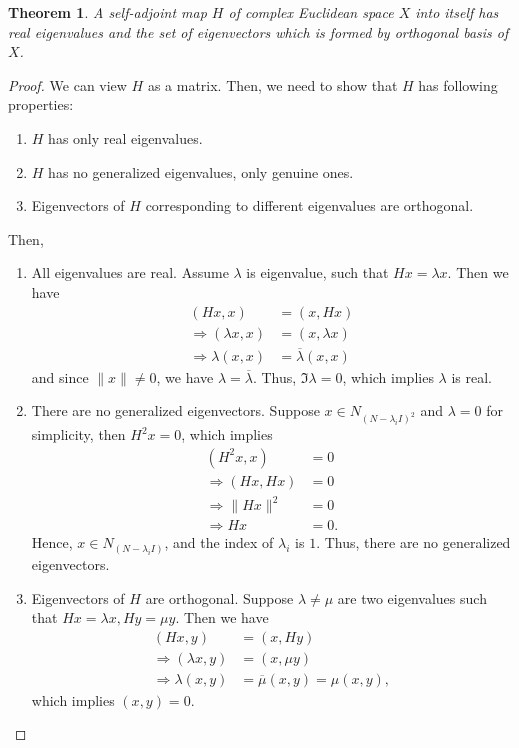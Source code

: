 \documentclass[11pt]{book}
\newtheorem{theorem}{Theorem}[section]
\theoremstyle{definition}
\numberwithin{equation}{chapter}
\begin{document}
\begin{theorem}\label{hermitian_eigenvalue_theorem}
A self-adjoint map $H$ of complex Euclidean space $X$ into itself has real eigenvalues and the set of eigenvectors which is formed by orthogonal basis of $X$.
\end{theorem}
\begin{proof}
We can view $H$ as a matrix. Then, we need to show that $H$ has following properties:
\begin{enumerate}[label=(\alph*)]
    \item $H$ has only real eigenvalues.
    
    \item $H$ has no generalized eigenvalues, only genuine ones.
    
    \item Eigenvectors of $H$ corresponding to different eigenvalues are orthogonal.
\end{enumerate}
Then, 
\begin{enumerate}[label=(\alph*)]
    \item All eigenvalues are real. Assume $\lambda$ is eigenvalue, such that $Hx = \lambda x$. Then we have
    \begin{align*}
        (Hx, x) & = (x, Hx) \\
        \Rightarrow (\lambda x, x) & = (x, \lambda x) \\
        \Rightarrow \lambda (x, x) & = \overline{\lambda} (x, x)
    \end{align*}
    and since $\|x\|\neq 0$, we have $\lambda = \overline{\lambda}$. Thus, $\Im \lambda = 0$, which implies $\lambda$ is real.
    \item There are no generalized eigenvectors. Suppose $x\in N_{(N - \lambda_i I)^2}$ and $\lambda = 0$ for simplicity, then $H^2 x = 0$, which implies
    \begin{align*}
        (H^2 x, x) & = 0 \\
        \Rightarrow (Hx, Hx) & = 0 \\
        \Rightarrow \|Hx\|^2 & = 0 \\
        \Rightarrow Hx & = 0.
    \end{align*}
    Hence, $x\in N_{(N - \lambda_i I)}$, and the index of $\lambda_i$ is $1$. Thus, there are no generalized eigenvectors.
    \item Eigenvectors of $H$ are orthogonal. Suppose $\lambda \neq \mu$ are two eigenvalues such that $Hx = \lambda x, Hy = \mu y$. Then we have
    \begin{align*}
        (Hx, y) & = (x, Hy) \\
        \Rightarrow (\lambda x, y) & = (x, \mu y) \\
        \Rightarrow \lambda(x, y) & = \overline{\mu} (x, y) = \mu (x, y),
    \end{align*}
    which implies $(x,y) = 0$. 
\end{enumerate}
\end{proof}
\end{document}
